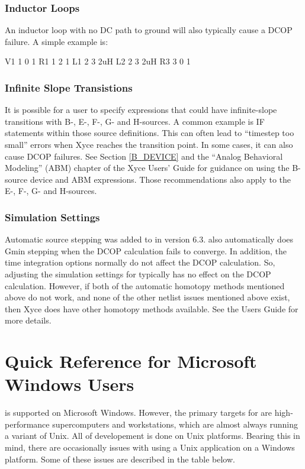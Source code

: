 \subsection{Inductor Loops}
An inductor loop with no DC path to ground will also typically cause a DCOP
failure.  A simple example is:
\begin{vquote}
V1 1 0 1
R1 1 2 1
L1 2 3 2uH
L2 2 3 2uH
R3 3 0 1
\end{vquote}

\subsection{Infinite Slope Transistions}
It is possible for a user to specify expressions that could have infinite-slope 
transitions with B-, E-, F-, G- and H-sources. A common example is IF statements
within those source definitions.  This can often lead to ``timestep too  small''
errors when Xyce reaches the transition point.  In some cases, it can also cause 
DCOP failures.  See Section \ref{B_DEVICE} and the ``Analog Behavioral Modeling'' 
(ABM) chapter of the Xyce Users' Guide for guidance on using the B-source device 
and ABM expressions.  Those recommendations also apply to the E-, F-, G- 
and H-sources.

\subsection{Simulation Settings}
Automatic source stepping was added to \Xyce{} in version 6.3.  \Xyce{} also automatically 
does Gmin stepping when the DCOP calculation fails to converge.  In addition, the time 
integration options normally do not affect the DCOP calculation.  So, adjusting the simulation
settings for \Xyce{} typically has no effect on the DCOP calculation.  However, if both of
the automatic homotopy methods mentioned above do not work, and none of the other
netlist issues mentioned above exist, then Xyce does have other homotopy methods 
available. See the \Xyce{} Users Guide \cite{Xyce_Users_Guide_6_5} for more details.

\chapter{Quick Reference for Microsoft Windows Users}
\label{Windows_Ref}

\Xyce{} is supported on Microsoft Windows.  However, the primary targets
for \Xyce{} are high-performance supercomputers and workstations, which
are almost always running a variant of Unix.  All of \Xyce{} 
developement is done on Unix platforms.  Bearing this in mind, there are
occasionally issues with using a Unix application on a Windows platform.
Some of these issues are described in the table below.




